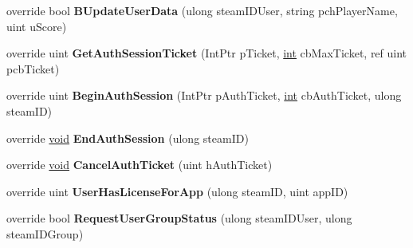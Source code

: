 \begin{DoxyCompactItemize}
\item 
\hypertarget{classValve_1_1Steamworks_1_1CSteamGameServer_a304559f41a202875aa68f7e327115075}{}override bool {\bfseries B\+Update\+User\+Data} (ulong steam\+I\+D\+User, string pch\+Player\+Name, uint u\+Score)\label{classValve_1_1Steamworks_1_1CSteamGameServer_a304559f41a202875aa68f7e327115075}

\item 
\hypertarget{classValve_1_1Steamworks_1_1CSteamGameServer_a08114e7ea43c4beca29a79755b646172}{}override uint {\bfseries Get\+Auth\+Session\+Ticket} (Int\+Ptr p\+Ticket, \hyperlink{SDL__thread_8h_a6a64f9be4433e4de6e2f2f548cf3c08e}{int} cb\+Max\+Ticket, ref uint pcb\+Ticket)\label{classValve_1_1Steamworks_1_1CSteamGameServer_a08114e7ea43c4beca29a79755b646172}

\item 
\hypertarget{classValve_1_1Steamworks_1_1CSteamGameServer_aa0dd4ea8213125fc28483754061ac9bf}{}override uint {\bfseries Begin\+Auth\+Session} (Int\+Ptr p\+Auth\+Ticket, \hyperlink{SDL__thread_8h_a6a64f9be4433e4de6e2f2f548cf3c08e}{int} cb\+Auth\+Ticket, ulong steam\+I\+D)\label{classValve_1_1Steamworks_1_1CSteamGameServer_aa0dd4ea8213125fc28483754061ac9bf}

\item 
\hypertarget{classValve_1_1Steamworks_1_1CSteamGameServer_acf975c6fd92d7d11f7974d5bca7a59a3}{}override \hyperlink{SDL__audio_8h_a52835ae37c4bb905b903cbaf5d04b05f}{void} {\bfseries End\+Auth\+Session} (ulong steam\+I\+D)\label{classValve_1_1Steamworks_1_1CSteamGameServer_acf975c6fd92d7d11f7974d5bca7a59a3}

\item 
\hypertarget{classValve_1_1Steamworks_1_1CSteamGameServer_a7ff628f367a4491d55959e7e190dd8b9}{}override \hyperlink{SDL__audio_8h_a52835ae37c4bb905b903cbaf5d04b05f}{void} {\bfseries Cancel\+Auth\+Ticket} (uint h\+Auth\+Ticket)\label{classValve_1_1Steamworks_1_1CSteamGameServer_a7ff628f367a4491d55959e7e190dd8b9}

\item 
\hypertarget{classValve_1_1Steamworks_1_1CSteamGameServer_a322f904f79579f3cb772cd96f8bde8c2}{}override uint {\bfseries User\+Has\+License\+For\+App} (ulong steam\+I\+D, uint app\+I\+D)\label{classValve_1_1Steamworks_1_1CSteamGameServer_a322f904f79579f3cb772cd96f8bde8c2}

\item 
\hypertarget{classValve_1_1Steamworks_1_1CSteamGameServer_a97afc4b22decf19d0efe41258a2db3c6}{}override bool {\bfseries Request\+User\+Group\+Status} (ulong steam\+I\+D\+User, ulong steam\+I\+D\+Group)\label{classValve_1_1Steamworks_1_1CSteamGameServer_a97afc4b22decf19d0efe41258a2db3c6}


\end{DoxyCompactItemize}

